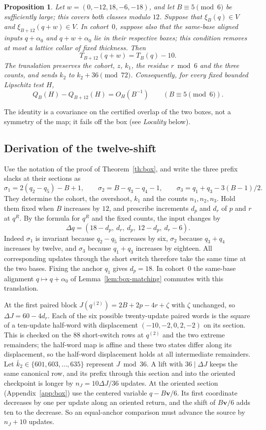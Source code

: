 \documentclass[11pt,reqno]{amsart}
\newtheorem{proposition}[theorem]{Proposition}
\theoremstyle{remark}
\newcommand{\vct}{\boldsymbol v}
\begin{document}
\begin{proposition}\label{prop:twelve}
Let \(w=(0,-12,18,-6,-18)\), and let \(B\equiv5\pmod6\) be sufficiently large; this covers both classes modulo \(12\). Suppose that \(\xi_B(q)\in V\) and \(\xi_{B+12}(q+w)\in V\). In cohort~\(0\), suppose also that the same-base aligned inputs \(q+\alpha_0\) and \(q+w+\alpha_0\) lie in their respective boxes; this condition removes at most a lattice collar of fixed thickness. Then
\[
 T_{B+12}(q+w)=T_B(q)-10 .
\]
The translation preserves the cohort, \(z\), \(k_1\), the residue \(r\bmod 6\) and the three counts, and sends \(k_2\) to \(k_2+36\pmod{72}\). Consequently, for every fixed bounded Lipschitz test \(H\),
\[
 Q_B(H)-Q_{B+12}(H)=O_H(B^{-1})\qquad(B\equiv5\pmod6).
\]
\end{proposition}

The identity is a covariance on the certified overlap of the two boxes, not a symmetry of the map; it fails off the box (see \emph{Locality} below).

\subsection{Derivation of the twelve-shift}
Use the notation of the proof of Theorem~\ref{th:box}, and write the three prefix slacks at their sections as
\[
 \sigma_1=2(q_2-q_5)-B+1,\qquad \sigma_2=B-q_3-q_4-1,\qquad \sigma_3=q_1+q_3-3(B-1)/2.
\]
They determine the cohort, the overshoot, \(k_1\) and the counts \(n_1,n_2,n_3\). Hold them fixed when \(B\) increases by \(12\), and prescribe increments \(d_p\) and \(d_r\) of \(p\) and \(r\) at \(q^R\). By the formula for \(q^R\) and the fixed counts, the input changes by
\[
 \Delta q=(18-d_p,\ d_r,\ d_p,\ 12-d_p,\ d_r-6).
\]
Indeed \(\sigma_1\) is invariant because \(q_2-q_5\) increases by six, \(\sigma_2\) because \(q_3+q_4\) increases by twelve, and \(\sigma_3\) because \(q_1+q_3\) increases by eighteen. All corresponding updates through the short switch therefore take the same time at the two bases. Fixing the anchor \(q_1\) gives \(d_p=18\). In cohort~\(0\) the same-base alignment \(q\mapsto q+\alpha_0\) of Lemma~\ref{lem:box-matching} commutes with this translation.

At the first paired block \(J(q^{(2)})=2B+2p-4r+\zeta\) with \(\zeta\) unchanged, so \(\Delta J=60-4d_r\). Each of the six possible twenty-update paired words is the square of a ten-update half-word with displacement \((-10,-2,0,2,-2)\) on its section. This is checked on the \(88\) short-switch rows at \(q^{(2)}\) and the two extreme remainders; the half-word map is affine and these two states differ along its displacement, so the half-word displacement holds at all intermediate remainders. Let \(\bar k_2\in\{601,603,\ldots,635\}\) represent \(J\bmod36\). A lift with \(36\mid\Delta J\) keeps the same canonical row, and its prefix through this section and into the oriented checkpoint is longer by \(n_J=10\Delta J/36\) updates. At the oriented section (Appendix~\ref{app:box}) use the centered variable \(q-B\vct/6\). Its first coordinate decreases by one per update along an oriented return, and the shift of \(B\vct/6\) adds ten to the decrease. So an equal-anchor comparison must advance the source by \(n_J+10\) updates.
\end{document}
